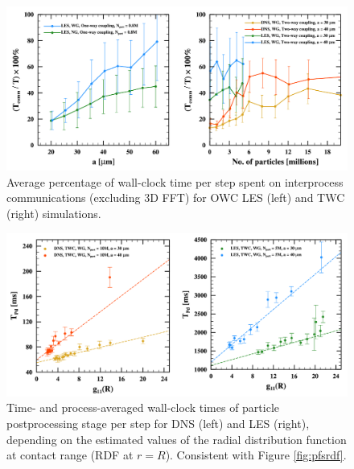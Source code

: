 
\begin{figure}
\centering
\includegraphics[width=13.5cm]{figures/3-12_pffcomm.pdf}
\caption{
Average percentage of wall-clock time per step spent on interprocess communications (excluding 3D FFT) for OWC LES (left) and TWC (right) simulations.
}
\label{fig:pffcomm}
\end{figure}
    
    
\begin{figure}
\centering
\includegraphics[width=13.5cm]{figures/3-13_pffrdfpd.pdf}
\caption{
Time- and process-averaged wall-clock times of particle postprocessing stage per step for DNS (left) and LES (right), depending on the estimated values of the radial distribution function at contact range (RDF at $r=R$).
Consistent with Figure \ref{fig:pfsrdf}.
}
\label{fig:pffrdfpd}
\end{figure}


